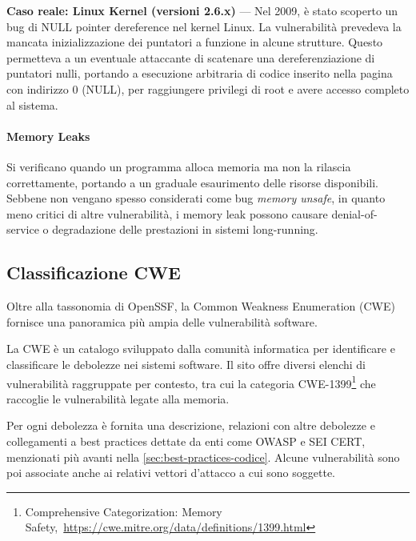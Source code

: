 \textbf{Caso reale: Linux Kernel (versioni 2.6.x)} — Nel 2009, è stato scoperto un
bug di NULL pointer dereference nel kernel Linux. La vulnerabilità prevedeva la
mancata inizializzazione dei puntatori a funzione in alcune strutture. Questo permetteva
a un eventuale attaccante di scatenare una dereferenziazione di puntatori nulli,
portando a esecuzione arbitraria di codice inserito nella pagina con indirizzo 0
(NULL), per raggiungere privilegi di root e avere accesso completo al sistema.\cite{null_pointer_dereference_linux}

\paragraph{Memory Leaks}
\label{sec:memory_leaks} Si verificano quando un programma alloca memoria ma non
la rilascia correttamente, portando a un graduale esaurimento delle risorse
disponibili. Sebbene non vengano spesso considerati come bug \textit{memory
unsafe}, in quanto meno critici di altre vulnerabilità, i memory leak possono
causare denial-of-service o degradazione delle prestazioni in sistemi long-running.

\subsection{Classificazione CWE}
Oltre alla tassonomia di OpenSSF, la Common Weakness Enumeration (CWE) fornisce
una panoramica più ampia delle vulnerabilità software.

La CWE è un catalogo sviluppato dalla comunità informatica per identificare e
classificare le debolezze nei sistemi software. Il sito offre diversi elenchi di
vulnerabilità raggruppate per contesto, tra cui la categoria CWE-1399\footnote{Comprehensive
Categorization: Memory Safety,~\url{https://cwe.mitre.org/data/definitions/1399.html}}
che raccoglie le vulnerabilità legate alla memoria.

Per ogni debolezza è fornita una descrizione, relazioni con altre debolezze e collegamenti
a best practices dettate da enti come OWASP e SEI CERT, menzionati più avanti
nella \autoref{sec:best-practices-codice}. Alcune vulnerabilità sono poi associate
anche ai relativi vettori d'attacco a cui sono soggette.